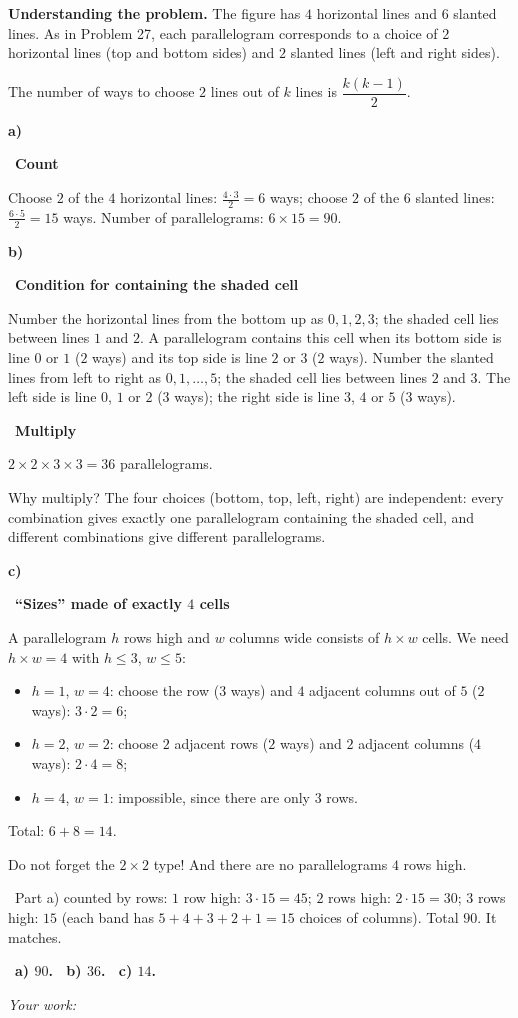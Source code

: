 \documentclass[11pt]{article}
\newif\ifsol \solfalse
\providecommand{\AnsWord}{Đáp số}
\newcommand{\ans}[1]{\par\smallskip{\bfseries\color{tmGreen!88!black}\AnsWord:}\ {\bfseries\color{AnsRed}#1}\par}
\newcommand{\probsol}[1]{%
  \begin{lrbox}{\solmeasure}\begin{minipage}{\dimexpr\linewidth-24pt\relax}#1\end{minipage}\end{lrbox}%
  \ifsol
    \begin{solbox}#1\end{solbox}%
  \else
    \setlength{\solht}{\dimexpr\ht\solmeasure+\dp\solmeasure+0.85cm\relax}%
    \ifdim\solht<1.35cm\setlength{\solht}{1.35cm}\fi
    \ifdim\solht>\StudentMaxWork\setlength{\solht}{\StudentMaxWork}\fi
    \begin{tcolorbox}[colback=white,colframe=Line,boxrule=0.8pt,arc=5pt,
      left=8pt,right=8pt,top=4pt,bottom=4pt,height=\solht]{\footnotesize\color{Slate}\itshape\WorkWord}\end{tcolorbox}%
  \fi}
\newlength{\StudentMaxWork}\setlength{\StudentMaxWork}{7.5cm}
\newcommand{\step}[2]{\par\smallskip\noindent{\bfseries\color{tmBlue!85!black}\StepWord~#1.}\ {\bfseries #2}\par\nopagebreak}
\newcommand{\verify}[1]{\par\smallskip\noindent{\bfseries\color{tmGreen!80!black}\faCheckCircle\ \CheckWord}\ #1\par}
\def\WorkWord{Your work:}
\def\AnsWord{Answer}
\def\StepWord{Step}
\def\CheckWord{Check:}
\begin{document}
\probsol{
\textbf{Understanding the problem.} The figure has $4$ horizontal lines and $6$ slanted lines. As in Problem 27,
each parallelogram corresponds to a choice of $2$ horizontal lines (top and bottom sides) and $2$ slanted lines
(left and right sides).
\begin{recallbox}The number of ways to choose $2$ lines out of $k$ lines is $\dfrac{k(k-1)}{2}$.\end{recallbox}

\textbf{a)}
\step{1}{Count}
Choose $2$ of the $4$ horizontal lines: $\tfrac{4\cdot 3}{2}=6$ ways; choose $2$ of the $6$ slanted lines:
$\tfrac{6\cdot5}{2}=15$ ways. Number of parallelograms: $6\times 15=90$.

\textbf{b)}
\step{2}{Condition for containing the shaded cell}
Number the horizontal lines from the bottom up as $0,1,2,3$; the shaded cell lies between lines $1$ and $2$. A
parallelogram contains this cell when its bottom side is line $0$ or $1$ ($2$ ways) and its top side is line $2$ or
$3$ ($2$ ways). Number the slanted lines from left to right as $0,1,\dots,5$; the shaded cell lies between lines $2$
and $3$. The left side is line $0$, $1$ or $2$ ($3$ ways); the right side is line $3$, $4$ or $5$ ($3$ ways).
\step{3}{Multiply}
$2\times 2\times 3\times 3=36$ parallelograms.
\begin{proofbox}Why multiply? The four choices (bottom, top, left, right) are independent: every combination gives
exactly one parallelogram containing the shaded cell, and different combinations give different
parallelograms.\end{proofbox}

\textbf{c)}
\step{4}{``Sizes'' made of exactly $4$ cells}
A parallelogram $h$ rows high and $w$ columns wide consists of $h\times w$ cells. We need $h\times w=4$ with
$h\le 3$, $w\le 5$:
\begin{itemize}[leftmargin=1.4em,itemsep=1pt]
\item $h=1$, $w=4$: choose the row ($3$ ways) and $4$ adjacent columns out of $5$ ($2$ ways): $3\cdot 2=6$;
\item $h=2$, $w=2$: choose $2$ adjacent rows ($2$ ways) and $2$ adjacent columns ($4$ ways): $2\cdot 4=8$;
\item $h=4$, $w=1$: impossible, since there are only $3$ rows.
\end{itemize}
Total: $6+8=14$.
\begin{warnbox}Do not forget the $2\times 2$ type! And there are no parallelograms $4$ rows high.\end{warnbox}
\verify{Part a) counted by rows: $1$ row high: $3\cdot 15=45$; $2$ rows high: $2\cdot 15=30$; $3$ rows high: $15$
(each band has $5+4+3+2+1=15$ choices of columns). Total $90$. It matches.}
\ans{a) $90$. \ b) $36$. \ c) $14$.}
}
\end{document}
